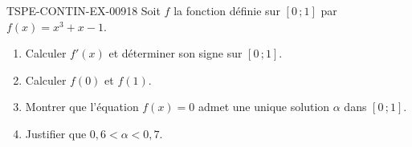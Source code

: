 \begin{exercice}{TSPE-CONTIN-EX-009}{1}{8}
Soit $f$ la fonction définie sur $[0\,;1]$ par $f(x) = x^3 + x - 1$.
\begin{enumerate}
  \item Calculer $f'(x)$ et déterminer son signe sur $[0\,;1]$.
  \item Calculer $f(0)$ et $f(1)$.
  \item Montrer que l'équation $f(x) = 0$ admet une unique solution $\alpha$ dans $[0\,;1]$.
  \item Justifier que $0{,}6 < \alpha < 0{,}7$.
\end{enumerate}
\end{exercice}
